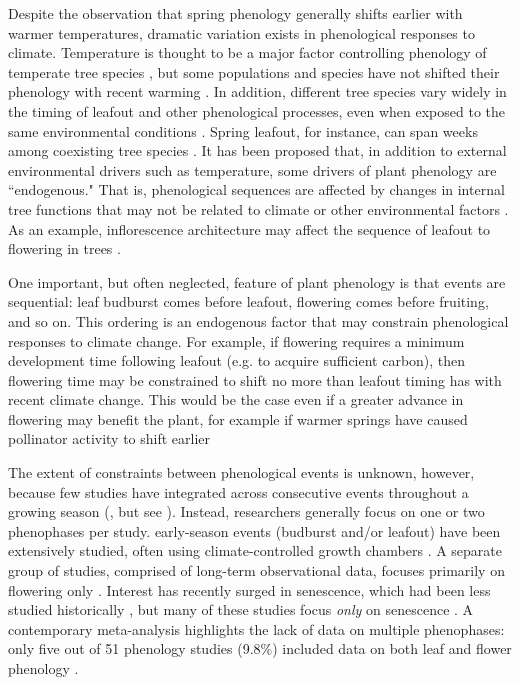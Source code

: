 \documentclass{article}
\begin{document}
\par Despite the observation that spring phenology generally shifts earlier with warmer temperatures, dramatic variation exists in phenological responses to climate. Temperature is thought to be a major factor controlling phenology of temperate tree species \citep{parmesan2006,richardson2006,morin2010,schwartz2013,clark2014b}, but some populations and species have not shifted their phenology with recent warming \citep{wolkovich2012}. In addition, different tree species vary widely in the timing of leafout and other phenological processes, even when exposed to the same environmental conditions \citep{lechowicz1984,primack2009c}. Spring leafout, for instance, can span weeks among coexisting tree species \citep{lechowicz1984}. It has been proposed that, in addition to external environmental drivers such as temperature, some drivers of plant phenology are ``endogenous." That is, phenological sequences are affected by changes in internal tree functions that may not be related to climate or other environmental factors \citep{borchert1992,marco2002}. As an example, inflorescence architecture may affect the sequence of leafout to flowering in trees \citep{marco2002}. 

\par One important, but often neglected, feature of plant phenology is that events are sequential: leaf budburst comes before leafout, flowering comes before fruiting, and so on. This ordering is an endogenous factor that may constrain phenological responses to climate change. For example, if flowering requires a minimum development time following leafout (e.g. to acquire sufficient carbon), then flowering time may be constrained to shift no more than leafout timing has with recent climate change. This would be the case even if a greater advance in flowering may benefit the plant, for example if warmer springs have caused pollinator activity to shift earlier \citep{polgar2013, thackeray2010}

\par The extent of constraints between phenological events is unknown, however, because few studies have integrated across consecutive events throughout a growing season (\cite{wolkovich2014}, but see \cite{li2016}). Instead, researchers generally focus on one or two phenophases per study. early-season events (budburst and/or leafout) have been extensively studied, often using climate-controlled growth chambers \citep[e.g.,][]{basler2012,laube2014}. A separate group of studies, comprised of long-term observational data, focuses primarily on flowering only \citep[e.g.,] []{fitter2002,millerrushing2008}. Interest has recently surged in senescence, which had been less studied historically \citep {parmesan2006}, but many of these studies focus \textit{only} on senescence \citep[e.g.,][]{taylor2008,archetti2013,jeong2014}. A contemporary meta-analysis highlights the lack of data on multiple phenophases: only five out of 51 phenology studies (9.8\%) included data on both leaf and flower phenology \citep{wolkovich2012}. 
\end{document}
